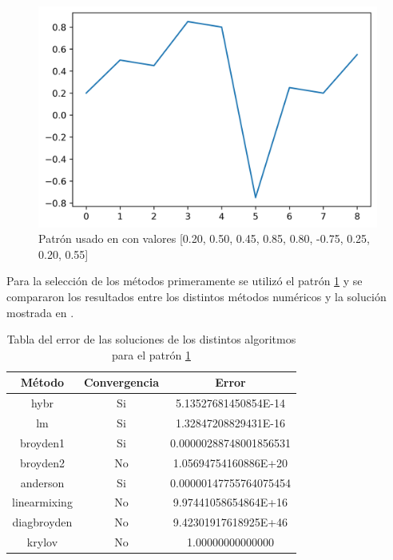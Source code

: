 \begin{figure} 
	\includegraphics{Graphics/guido20118-pattern.png}
	\caption{Patrón usado en \cite{Guido2018} con valores [0.20, 0.50, 0.45, 0.85, 0.80, -0.75, 0.25, 0.20, 0.55]}\label{fig:Guido2018-pattern}
\end{figure}

Para la selección de los métodos primeramente se utilizó el patrón \ref{fig:Guido2018-pattern} y se compararon los
resultados entre los distintos métodos numéricos y la solución mostrada en \cite{Guido2018}.

\begin{table}[h!]
	\centering
	\begin{tabular}{|c|c|c|} \toprule
		Método &  Convergencia & Error \\ \midrule
		hybr   &  Si         & 5.13527681450854E-14 \\
		lm   &  Si           & 1.32847208829431E-16 \\ 
		broyden1   &  Si     & 0.00000288748001856531 \\ 
		broyden2   &  No     & 1.05694754160886E+20 \\ 
		anderson   &  Si     & 0.00000147755764075454 \\
		linearmixing   &  No  & 9.97441058654864E+16 \\
		diagbroyden   &  No  & 9.42301917618925E+46 \\
		krylov   &  No       & 1.00000000000000  \\ \bottomrule
	\end{tabular}
	\caption{Tabla del error de las soluciones de los distintos algoritmos para el patrón \ref{fig:Guido2018-pattern}}\label{table:error-pattern-guido}
\end{table}
 
